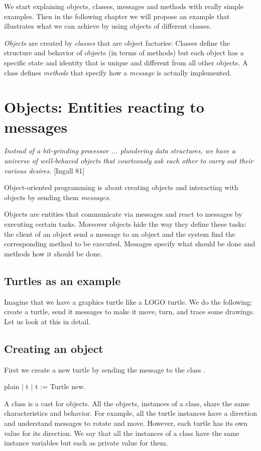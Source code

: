 \documentclass[10pt,twoside,english]{_support/latex/sbabook/sbabook}
\begin{document}
We start explaining objects, classes, messages and methods with really simple examples. Then in the following chapter we will propose an example that illustrates what we can achieve by using objects of different classes. 

\textit{Objects} are created by \textit{classes} that are object factories: Classes define the structure and behavior of objects (in terms of methods) but each object has a specific state and identity that is unique and different from all other objects. A class defines \textit{methods} that specify how a \textit{message} is actually implemented. 
\section{Objects: Entities reacting to messages}
\textit{Instead of a bit-grinding processor ... plundering data structures, we have a universe of well-behaved objects that courteously ask each other to carry out their various desires.} {[}Ingall 81{]}

Object-oriented programming is about creating objects and interacting with objects by sending them \textit{messages}.

Objects are entities that communicate via messages and react to messages by executing certain tasks. Moreover objects hide the way they define these tasks: the client of an object send a message to an object and the system find the corresponding method to be executed. Messages specify what should be done and methods how it should be done. 
\subsection{Turtles as an example}
Imagine that we have a graphics turtle like a LOGO turtle. We do the following: create a turtle, send it messages to make it move, turn, and trace some drawings. Let us look at this in detail.
\subsection{Creating an object}
First we create a new turtle by sending the message  to the class . 

\begin{displaycode}{plain}
| t |
t := Turtle new. 
\end{displaycode}

A class is a cast for objects. All the objects, instances of a class, share the same characteristics and behavior. For example, all the turtle instances have a direction and understand messages to rotate and move. However, each turtle has its own value for its direction.
We say that all the instances of a class have the same instance variables but each as private value
for them. 
\end{document}
